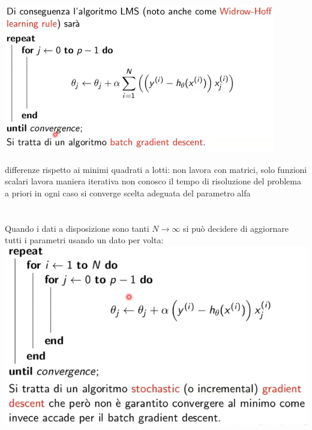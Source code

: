 \documentclass[10pt,a4paper]{article}
\begin{document}
\includegraphics[scale=0.41]{lms.png} 

differenze rispetto ai minimi quadrati a lotti:
non lavora con matrici, solo funzioni scalari
lavora maniera iterativa
non conosco il tempo di risoluzione del problema a priori
in ogni caso si converge
scelta adeguata del parametro alfa\\ \\ \\

Quando i dati a disposizione sono tanti $ N\rightarrow\infty $ si può decidere di aggiornare tutti i parametri usando un dato per volta:\\

\includegraphics[scale=0.41]{lms2.png} 
\end{document}
